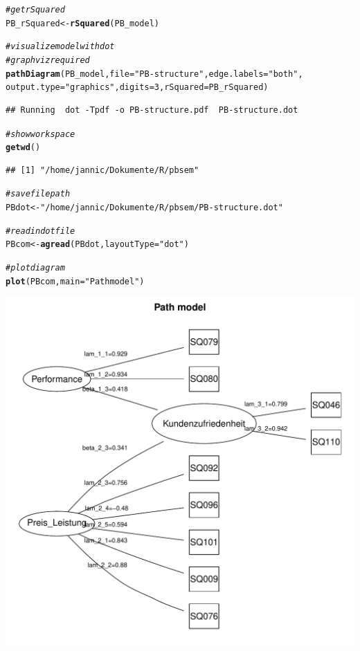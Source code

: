 \documentclass{article}\usepackage[]{graphicx}\usepackage[]{color}
\makeatletter
\def\maxwidth{ %
  \ifdim\Gin@nat@width>\linewidth
    \linewidth
  \else
    \Gin@nat@width
  \fi
}
\newcommand{\hlnum}[1]{\textcolor[rgb]{0.686,0.059,0.569}{#1}}%
\newcommand{\hlstr}[1]{\textcolor[rgb]{0.192,0.494,0.8}{#1}}%
\newcommand{\hlcom}[1]{\textcolor[rgb]{0.678,0.584,0.686}{\textit{#1}}}%
\newcommand{\hlstd}[1]{\textcolor[rgb]{0.345,0.345,0.345}{#1}}%
\newcommand{\hlkwb}[1]{\textcolor[rgb]{0.69,0.353,0.396}{#1}}%
\newcommand{\hlkwc}[1]{\textcolor[rgb]{0.333,0.667,0.333}{#1}}%
\newcommand{\hlkwd}[1]{\textcolor[rgb]{0.737,0.353,0.396}{\textbf{#1}}}%
\newenvironment{kframe}{%
 \def\at@end@of@kframe{}%
 \ifinner\ifhmode%
  \def\at@end@of@kframe{\end{minipage}}%
  \begin{minipage}{\columnwidth}%
 \fi\fi%
 \def\FrameCommand##1{\hskip\@totalleftmargin \hskip-\fboxsep
 \colorbox{shadecolor}{##1}\hskip-\fboxsep
     \hskip-\linewidth \hskip-\@totalleftmargin \hskip\columnwidth}%
 \MakeFramed {\advance\hsize-\width
   \@totalleftmargin\z@ \linewidth\hsize
   \@setminipage}}%
 {\par\unskip\endMakeFramed%
 \at@end@of@kframe}
\newenvironment{knitrout}{}{} %
\makeatother
\begin{document}
\begin{knitrout}
\begin{kframe}
\begin{alltt}
\hlcom{#get rSquared}
\hlstd{PB_rSquared} \hlkwb{<-} \hlkwd{rSquared}\hlstd{(PB_model)}

\hlcom{#visualize model with dot }
\hlcom{#graphviz required}
\hlkwd{pathDiagram}\hlstd{(PB_model,} \hlkwc{file} \hlstd{=} \hlstr{"PB-structure"}\hlstd{,} \hlkwc{edge.labels} \hlstd{=} \hlstr{"both"}\hlstd{,}
           \hlkwc{output.type} \hlstd{=} \hlstr{"graphics"}\hlstd{,} \hlkwc{digits} \hlstd{=} \hlnum{3}\hlstd{,} \hlkwc{rSquared}\hlstd{=PB_rSquared)}
\end{alltt}
\begin{verbatim}
## Running  dot -Tpdf -o PB-structure.pdf  PB-structure.dot
\end{verbatim}
\begin{alltt}
\hlcom{#show workspace}
\hlkwd{getwd}\hlstd{()}
\end{alltt}
\begin{verbatim}
## [1] "/home/jannic/Dokumente/R/pbsem"
\end{verbatim}
\begin{alltt}
\hlcom{#save filepath}
\hlstd{PBdot} \hlkwb{<-} \hlstr{"/home/jannic/Dokumente/R/pbsem/PB-structure.dot"}

\hlcom{#read in dot file}
\hlstd{PBcom} \hlkwb{<-} \hlkwd{agread}\hlstd{(PBdot,} \hlkwc{layoutType}\hlstd{=}\hlstr{"dot"}\hlstd{)}

\hlcom{#plot diagram}
\hlkwd{plot}\hlstd{(PBcom,} \hlkwc{main}\hlstd{=}\hlstr{"Path model"}\hlstd{)}
\end{alltt}
\end{kframe}
\includegraphics[width=\maxwidth]{figure/semPLS2} 

\end{knitrout}
\end{document}
